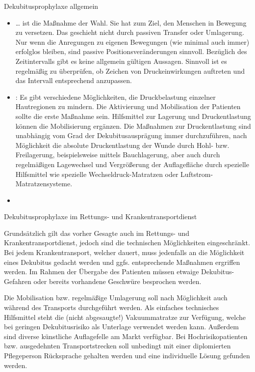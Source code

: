 \Text
{Dekubitusprophylaxe allgemein}
{
\begin{itemize}
  \item {} \ldots{} ist die Maßnahme der
  Wahl. Sie hat zum Ziel, den Menschen in Bewegung zu
  versetzen. Das geschieht nicht durch passiven Transfer oder Umlagerung.
  Nur wenn die Anregungen zu eigenen Bewegungen (wie minimal
  auch immer) erfolglos bleiben, sind passive
  Positionsveränderungen sinnvoll. Bezüglich des
  Zeitintervalls gibt es keine allgemein gültigen Aussagen.
  Sinnvoll ist es regelmäßig zu überprüfen, ob Zeichen von Druckeinwirkungen auftreten
  und das Intervall entsprechend anzupassen.
  \item {}: Es gibt verschiedene
  Möglichkeiten, die Druckbelastung einzelner Hautregionen zu mindern. Die
  Aktivierung und Mobilisation der Patienten sollte die
  erste Maßnahme sein. Hilfsmittel zur Lagerung und
  Druckentlastung können die Mobilisierung ergänzen. Die
  Maßnahmen zur Druckentlastung sind unabhängig vom Grad der
  Dekubitusausprägung immer durchzuführen, nach Möglichkeit
  die absolute Druckentlastung der Wunde durch Hohl- bzw.
  Freilagerung, beispielsweise mittels Bauchlagerung, aber
  auch durch regelmäßigen Lagewechsel und Vergrößerung der
  Auflagefläche durch spezielle Hilfsmittel wie spezielle
  Wechseldruck-Matratzen oder Luftstrom-Matratzensysteme.
  \cite{Pflegewiki:Dekubitus}
  \item {}
\end{itemize}


}
{}
{}
{}
{}




\Text
{Dekubitusprophylaxe im Rettungs- und
Krankentransportdienst}
{
Grundsätzlich gilt das vorher Gesagte auch im Rettungs- und
Krankentransportdienst, jedoch sind die technischen
Möglichkeiten eingeschränkt. Bei jedem Krankentransport,
welcher  dauert, muss jedenfalls
an die Möglichkeit eines Dekubitus gedacht werden und ggfs.
entsprechende Maßnahmen ergriffen werden. Im Rahmen der
Übergabe des Patienten müssen etwaige Dekubitus-Gefahren
oder bereits vorhandene Geschwüre besprochen werden.

Die Mobilisation bzw. regelmäßige Umlagerung soll nach
Möglichkeit auch während des Transports durchgeführt
werden. Als einfaches technisches Hilfsmittel steht die
(nicht abgesaugte!) Vakuummatratze zur Verfügung, welche bei
geringen Dekubitusrisiko als Unterlage verwendet werden
kann. Außerdem sind diverse künstliche
Auflagefelle am Markt verfügbar. Bei Hochrisikopatienten
bzw. ausgedehnten Transportstrecken soll unbedingt mit einer
diplomierten Pflegeperson Rücksprache gehalten werden und
eine individuelle Lösung gefunden werden.

}
{}
{}
{}
{}

